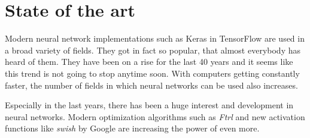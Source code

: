 \section{State of the art}
\label{sec:state-of-the-art}

Modern neural network implementations such as Keras in TensorFlow \cite{tensorflow2015-whitepaper} are used in a broad variety of fields.
They got in fact so popular, that almost everybody has heard of them.
They have been on a rise for the last 40 years and it seems like this trend is not going to stop anytime soon.
With computers getting constantly faster, the number of fields in which neural networks can be used also increases.

Especially in the last years, there has been a huge interest and development in neural networks.
Modern optimization algorithms such as \emph{Ftrl} \cite{McMahan} and new activation functions like \emph{swish} \cite{DBLP:journals/corr/abs-1710-05941} by Google are increasing the power of even more.